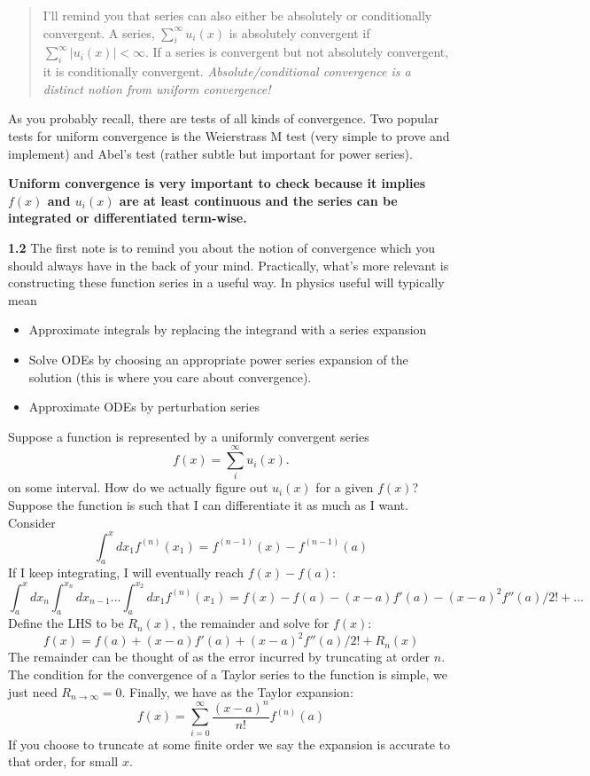 \documentclass[11pt]{article}
\providecommand{\tightlist}{%
      \setlength{\itemsep}{0pt}\setlength{\parskip}{0pt}}
\begin{document}
\begin{quote}
I'll remind you that series can also either be absolutely or
conditionally convergent. A series, \(\sum_i^\infty u_i(x)\) is
absolutely convergent if \(\sum_i^\infty |u_i(x)|<\infty\). If a series
is convergent but not absolutely convergent, it is conditionally
convergent. \emph{Absolute/conditional convergence is a distinct notion
from uniform convergence!}
\end{quote}

As you probably recall, there are tests of all kinds of convergence. Two
popular tests for uniform convergence is the Weierstrass M test (very
simple to prove and implement) and Abel's test (rather subtle but
important for power series).

\textbf{Uniform convergence is very important to check because it
implies \(f(x)\) and \(u_i(x)\) are at least continuous and the series
can be integrated or differentiated term-wise.}

\textbf{1.2} The first note is to remind you about the notion of
convergence which you should always have in the back of your mind.
Practically, what's more relevant is constructing these function series
in a useful way. In physics useful will typically mean

\begin{itemize}
\tightlist
\item
  Approximate integrals by replacing the integrand with a series
  expansion
\item
  Solve ODEs by choosing an appropriate power series expansion of the
  solution (this is where you care about convergence).
\item
  Approximate ODEs by perturbation series
\end{itemize}

Suppose a function is represented by a uniformly convergent series \[
f(x)=\sum_i^\infty u_i(x) .
\] on some interval. How do we actually figure out \(u_i(x)\) for a
given \(f(x)\)? Suppose the function is such that I can differentiate it
as much as I want. Consider \[
\int_a^xdx_1f^{(n)}(x_1)=f^{(n-1)}(x)-f^{(n-1)}(a)
\] If I keep integrating, I will eventually reach \(f(x)-f(a)\): \[
\int_a^xdx_n\int_{a}^{x_n}dx_{n-1}...\int_a^{x_2}dx_1f^{(n)}(x_1)=f(x)-f(a)-(x-a)f'(a)-(x-a)^2f''(a)/2!+...
\] Define the LHS to be \(R_n(x)\), the remainder and solve for
\(f(x)\): \[
f(x)=f(a)+(x-a)f'(a)+(x-a)^2f''(a)/2!+R_n(x)
\] The remainder can be thought of as the error incurred by truncating
at order \(n\). The condition for the convergence of a Taylor series to
the function is simple, we just need \(R_{n\to\infty}=0\). Finally, we
have as the Taylor expansion: \[
f(x) = \sum^\infty_{i=0}\frac{(x-a)^n}{n!}f^{(n)}(a)
\] If you choose to truncate at some finite order we say the expansion
is accurate to that order, for small \(x\).
\end{document}
